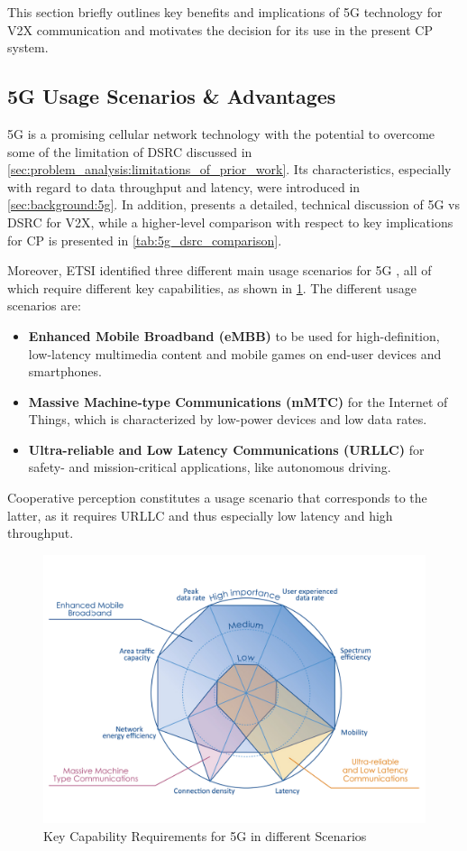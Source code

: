 This section briefly outlines key benefits and implications of 5G technology for V2X communication and motivates the decision for its use in the present CP system.

\subsection{5G Usage Scenarios \& Advantages}
\label{subsec:concept_design:5g_usage_scenarios_advantages}
5G is a promising cellular network technology with the potential to overcome some of the limitation of DSRC discussed in \cref{sec:problem_analysis:limitations_of_prior_work}. Its characteristics, especially with regard to data throughput and latency, were introduced in \cref{sec:background:5g}. In addition, \cite{5GAutomotiveAssociation2016} presents a detailed, technical discussion of 5G vs DSRC for V2X, while a higher-level comparison with respect to key implications for CP is presented in \cref{tab:5g_dsrc_comparison}.
\par
\bigskip

Moreover, ETSI identified three different main usage scenarios for 5G \cite{ETSI5G}, all of which require different key capabilities, as shown in \cref{fig:5g_capabilities}. The different usage scenarios are:

\begin{itemize}
	\item \textbf{Enhanced Mobile Broadband (eMBB)} to be used for high-definition, low-latency multimedia content and mobile games on end-user devices and smartphones.
	\item \textbf{Massive Machine-type Communications (mMTC)} for the Internet of Things, which is characterized by low-power devices and low data rates.
	\item \textbf{Ultra-reliable and Low Latency Communications (URLLC)} for safety- and mission-critical applications, like autonomous driving. 
\end{itemize}

Cooperative perception constitutes a usage scenario that corresponds to the latter, as it requires URLLC and thus especially low latency and high throughput.

\begin{figure}[h]
	\centering
	\includegraphics[width=0.75\linewidth]{98_images/5g_spider_chart}
	\caption[Key Capability Requirements for 5G]{Key Capability Requirements for 5G in different Scenarios \cite{ETSI5G}}
	\label{fig:5g_capabilities}
\end{figure}

